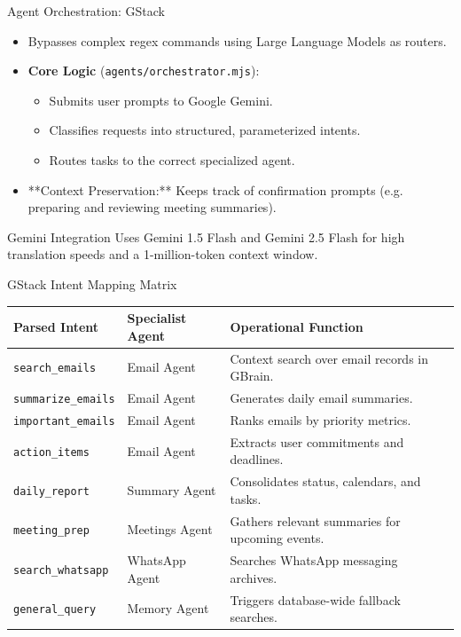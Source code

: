 \documentclass[10pt]{beamer}
\begin{document}
\begin{frame}{Agent Orchestration: GStack}
  \begin{itemize}
    \item Bypasses complex regex commands using Large Language Models as routers.
    \item \textbf{Core Logic} (\texttt{agents/orchestrator.mjs}):
      \begin{itemize}
        \item Submits user prompts to Google Gemini.
        \item Classifies requests into structured, parameterized intents.
        \item Routes tasks to the correct specialized agent.
      \end{itemize}
    \item **Context Preservation:** Keeps track of confirmation prompts (e.g. preparing and reviewing meeting summaries).
  \end{itemize}
  \vfill
  \begin{block}{Gemini Integration}
    Uses Gemini 1.5 Flash and Gemini 2.5 Flash for high translation speeds and a 1-million-token context window.
  \end{block}
\end{frame}

\begin{frame}{GStack Intent Mapping Matrix}
  \centering
  \scriptsize
  \begin{tabular}{L{3.0cm} L{2.2cm} L{6.0cm}}
    \toprule
    \textbf{Parsed Intent} & \textbf{Specialist Agent} & \textbf{Operational Function} \\
    \midrule
    \texttt{search\_emails} & Email Agent & Context search over email records in GBrain. \\
    \texttt{summarize\_emails} & Email Agent & Generates daily email summaries. \\
    \texttt{important\_emails} & Email Agent & Ranks emails by priority metrics. \\
    \texttt{action\_items} & Email Agent & Extracts user commitments and deadlines. \\
    \texttt{daily\_report} & Summary Agent & Consolidates status, calendars, and tasks. \\
    \texttt{meeting\_prep} & Meetings Agent & Gathers relevant summaries for upcoming events. \\
    \texttt{search\_whatsapp} & WhatsApp Agent & Searches WhatsApp messaging archives. \\
    \texttt{general\_query} & Memory Agent & Triggers database-wide fallback searches. \\
    \bottomrule
  \end{tabular}
\end{frame}
\end{document}
